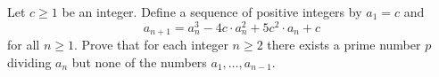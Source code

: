 Let 
$c \ge 1$
 be an integer. Define a sequence of positive integers by 
$a_1 = c$
 and 
\[a_{n+1}=a_n^3-4c\cdot a_n^2+5c^2\cdot a_n+c\]
 for all 
$n\ge 1$.
 Prove that for each integer 
$n \ge 2$
 there exists a prime number 
$p$
 dividing 
$a_n$
 but none of the numbers 
$a_1 , \ldots , a_{n -1}$.


